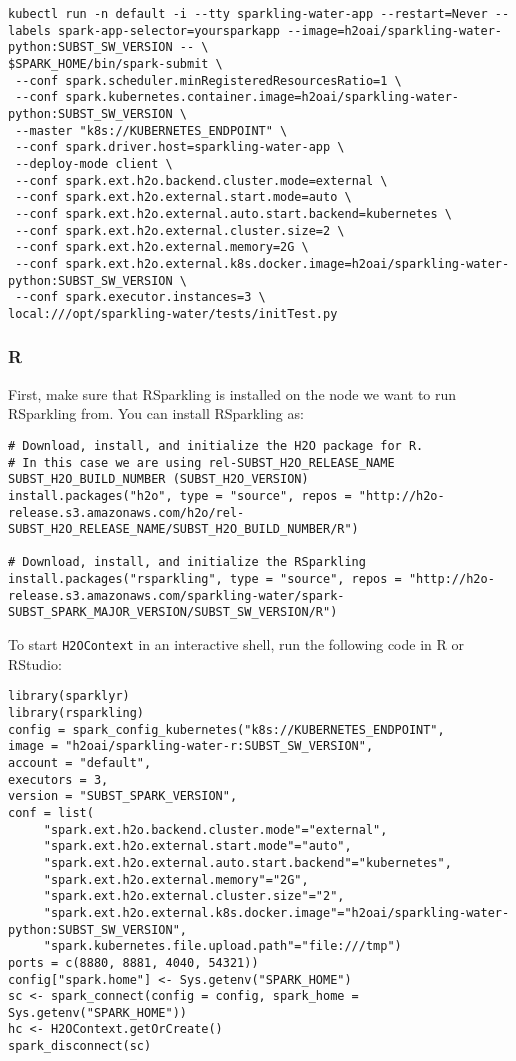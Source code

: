 \begin{lstlisting}[style=Bash]
kubectl run -n default -i --tty sparkling-water-app --restart=Never --labels spark-app-selector=yoursparkapp --image=h2oai/sparkling-water-python:SUBST_SW_VERSION -- \
$SPARK_HOME/bin/spark-submit \
 --conf spark.scheduler.minRegisteredResourcesRatio=1 \
 --conf spark.kubernetes.container.image=h2oai/sparkling-water-python:SUBST_SW_VERSION \
 --master "k8s://KUBERNETES_ENDPOINT" \
 --conf spark.driver.host=sparkling-water-app \
 --deploy-mode client \
 --conf spark.ext.h2o.backend.cluster.mode=external \
 --conf spark.ext.h2o.external.start.mode=auto \
 --conf spark.ext.h2o.external.auto.start.backend=kubernetes \
 --conf spark.ext.h2o.external.cluster.size=2 \
 --conf spark.ext.h2o.external.memory=2G \
 --conf spark.ext.h2o.external.k8s.docker.image=h2oai/sparkling-water-python:SUBST_SW_VERSION \
 --conf spark.executor.instances=3 \
local:///opt/sparkling-water/tests/initTest.py
\end{lstlisting}

\subsubsection{R}

First, make sure that RSparkling is installed on the node we want to run RSparkling from.
You can install RSparkling as:

\begin{lstlisting}[style=R]
# Download, install, and initialize the H2O package for R.
# In this case we are using rel-SUBST_H2O_RELEASE_NAME SUBST_H2O_BUILD_NUMBER (SUBST_H2O_VERSION)
install.packages("h2o", type = "source", repos = "http://h2o-release.s3.amazonaws.com/h2o/rel-SUBST_H2O_RELEASE_NAME/SUBST_H2O_BUILD_NUMBER/R")

# Download, install, and initialize the RSparkling
install.packages("rsparkling", type = "source", repos = "http://h2o-release.s3.amazonaws.com/sparkling-water/spark-SUBST_SPARK_MAJOR_VERSION/SUBST_SW_VERSION/R")
\end{lstlisting}

To start \texttt{H2OContext} in an interactive shell, run the following code in R or RStudio:

\begin{lstlisting}[style=R]
library(sparklyr)
library(rsparkling)
config = spark_config_kubernetes("k8s://KUBERNETES_ENDPOINT",
image = "h2oai/sparkling-water-r:SUBST_SW_VERSION",
account = "default",
executors = 3,
version = "SUBST_SPARK_VERSION",
conf = list(
     "spark.ext.h2o.backend.cluster.mode"="external",
     "spark.ext.h2o.external.start.mode"="auto",
     "spark.ext.h2o.external.auto.start.backend"="kubernetes",
     "spark.ext.h2o.external.memory"="2G",
     "spark.ext.h2o.external.cluster.size"="2",
     "spark.ext.h2o.external.k8s.docker.image"="h2oai/sparkling-water-python:SUBST_SW_VERSION",
     "spark.kubernetes.file.upload.path"="file:///tmp")
ports = c(8880, 8881, 4040, 54321))
config["spark.home"] <- Sys.getenv("SPARK_HOME")
sc <- spark_connect(config = config, spark_home = Sys.getenv("SPARK_HOME"))
hc <- H2OContext.getOrCreate()
spark_disconnect(sc)
\end{lstlisting}


